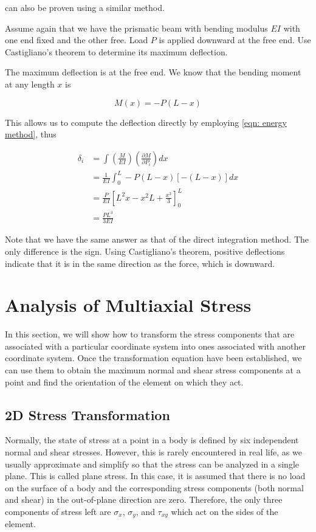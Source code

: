 \documentclass[a4paper,openany,12pt]{book}
\begin{document}
\begin{enumerate}
can also be proven using a similar method.

Assume again that we have the prismatic beam with bending modulus \(EI\)
with one end fixed and the other free. Load \(P\) is applied downward at
the free end. Use Castigliano's theorem to determine its maximum
deflection.

The maximum deflection is at the free end. We know that the bending
moment at any length \(x\) is

$$M(x) =  - P(L - x)$$

This allows us to compute the deflection directly by employing \ref{eqn: energy method}, thus

$$\begin{aligned}
  \delta_i &= \int \left( \frac{M}{EI} \right) \left( \frac{\partial M}{\partial P_i} \right)dx \\ 
              &= \frac{1}{EI}\int_0^L  - P(L - x)[ - (L - x)]dx  \\ 
              &= \frac{P}{EI}\left[ L^2x - x^2L + \frac{x^3}{3} \right]_0^L \\ 
              &= \frac{PL^3}{3EI} \end{aligned}$$

Note that we have the same answer as that of the direct integration
method. The only difference is the sign. Using Castigliano's theorem,
positive deflections indicate that it is in the same direction as the
force, which is downward.
\end{enumerate}

\section{Analysis of Multiaxial Stress}
\label{section: multiaxial stress}
In this section, we will show how to transform the stress components
that are associated with a particular coordinate system into ones
associated with another coordinate system. Once the transformation
equation have been established, we can use them to obtain the maximum
normal and shear stress components at a point and find the orientation
of the element on which they act.

\subsection{2D Stress Transformation}
\label{d-stress-transformation}
Normally, the state of stress at a point in a body is defined by six
independent normal and shear stresses. However, this is rarely
encountered in real life, as we usually approximate and simplify so that
the stress can be analyzed in a single plane. This is called plane
stress. In this case, it is assumed that there is no load on the surface
of a body and the corresponding stress components (both normal and
shear) in the out-of-plane direction are zero. Therefore, the only three
components of stress left are \(\sigma_x\), \(\sigma_y\), and \(\tau_{xy}\)
which act on the sides of the element.
\end{document}
